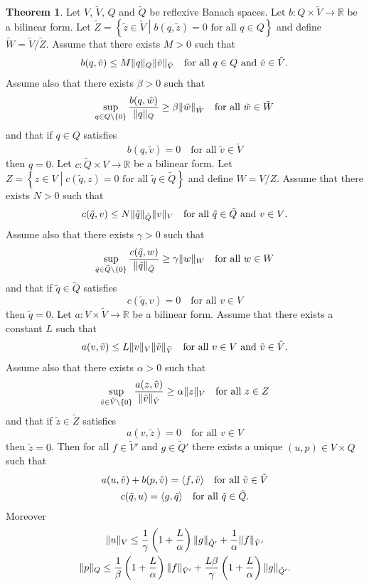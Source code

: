 \documentclass[a4paper,10pt,twoside]{amsbook}
\numberwithin{section}{chapter}
\numberwithin{equation}{chapter}
\theoremstyle{definition}
\newtheorem{thm}[prop]{Theorem}
\DeclarePairedDelimiter{\norm}{\lVert}{\rVert}
\DeclarePairedDelimiter{\dual}{\langle}{\rangle}
\begin{document}
\begin{thm}
\label{thm:mixed-elliptic}
Let $V$, $\tilde V$, $Q$ and $\tilde Q$ be reflexive Banach spaces. Let $b\colon Q\times\tilde V\to\mathbb{R}$ be a bilinear form. Let $\tilde{Z}=\left\{\tilde{z}\in\tilde V\middle|\text{$b(q,\tilde z)=0$ for all $q\in Q$}\right\}$ and define $\tilde W=\tilde V/\tilde Z$. Assume that there exists $M>0$ such that
\[
b(q,\tilde v)\le M\norm{q}_Q\norm{\tilde v}_{\tilde V}\quad\text{for all $q\in Q$ and $\tilde v\in\tilde V$}.
\]
Assume also that there exists $\beta>0$ such that
\[
\sup_{q\in Q\setminus\{0\}}\frac{b(q,\tilde w)}{\norm{q}_Q}\ge\beta\norm{\tilde w}_{\tilde W}\quad\text{for all $\tilde w\in\tilde W$}
\]
and that if $q\in Q$ satisfies
\[
b(q,\tilde v)=0\quad\text{for all $\tilde v\in\tilde V$}
\]
then $q=0$. Let $c\colon\tilde Q\times V\to\mathbb{R}$ be a bilinear form. Let $Z=\left\{z\in V\middle|\text{$c(\tilde q,z)=0$ for all $\tilde q\in\tilde Q$}\right\}$ and define $W=V/Z$. Assume that there exists $N>0$ such that
\[
c(\tilde q,v)\le N\norm{\tilde q}_{\tilde Q}\norm{v}_{V}\quad\text{for all $\tilde q\in\tilde Q$ and $v\in V$}.
\]
Assume also that there exists $\gamma>0$ such that
\[
\sup_{\tilde q\in \tilde Q\setminus\{0\}}\frac{c(\tilde q,w)}{\norm{\tilde q}_{\tilde Q}}\ge\gamma\norm{w}_{W}\quad\text{for all $w\in W$}
\]
and that if $\tilde q\in\tilde Q$ satisfies
\[
c(\tilde q,v)=0\quad\text{for all $v\in V$}
\]
then $\tilde q=0$. Let $a\colon V\times\tilde V\to\mathbb{R}$ be a bilinear form. Assume that there exists a constant $L$ such that
\[
a(v,\tilde v)\le L\norm{v}_V\norm{\tilde v}_{\tilde V}\quad\text{for all $v\in V$ and $\tilde v\in\tilde V$}.
\]
Assume also that there exists $\alpha>0$ such that
\[
\sup_{\tilde v\in\tilde V\setminus\{0\}}\frac{a(z,\tilde v)}{\norm{\tilde v}_{\tilde V}}\ge\alpha\norm{z}_V\quad\text{for all $z\in Z$}
\]
and that if $\tilde z\in\tilde Z$ satisfies
\[
a(v,\tilde z)=0\quad\text{for all $v\in V$}
\]
then $\tilde z=0$. Then for all $f\in\tilde V'$ and $g\in\tilde Q'$ there exists a unique $(u,p)\in V\times Q$ such that
\begin{gather*}
a(u,\tilde v)+b(p,\tilde v)=\dual{f,\tilde v}\quad\text{for all $\tilde v\in\tilde V$} \\
c(\tilde q,u)=\dual{g,\tilde q}\quad\text{for all $\tilde q\in\tilde Q$}.
\end{gather*}
Moreover
\begin{gather*}
\norm{u}_V\le\frac{1}{\gamma}\left(1+\frac{L}{\alpha}\right)\norm{g}_{\tilde Q'}+\frac{1}{\alpha}\norm{f}_{\tilde V'} \\
\norm{p}_Q\le\frac{1}{\beta}\left(1+\frac{L}{\alpha}\right)\norm{f}_{\tilde V'}+\frac{L\beta}{\gamma}\left(1+\frac{L}{\alpha}\right)\norm{g}_{\tilde Q'}.
\end{gather*}
\end{thm}
\end{document}
